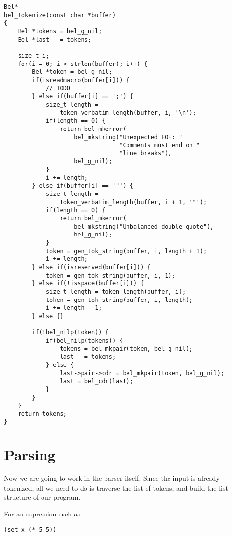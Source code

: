 \documentclass[openright,a4paper,twoside,12pt]{memoir}
\begin{document}
\begin{verbatim}
Bel*
bel_tokenize(const char *buffer)
{
    Bel *tokens = bel_g_nil;
    Bel *last   = tokens;
    
    size_t i;
    for(i = 0; i < strlen(buffer); i++) {
        Bel *token = bel_g_nil;
        if(isreadmacro(buffer[i])) {
            // TODO
        } else if(buffer[i] == ';') {
            size_t length =
                token_verbatim_length(buffer, i, '\n');
            if(length == 0) {
                return bel_mkerror(
                    bel_mkstring("Unexpected EOF: "
                                 "Comments must end on "
                                 "line breaks"),
                    bel_g_nil);
            }
            i += length;
        } else if(buffer[i] == '"') {
            size_t length =
                token_verbatim_length(buffer, i + 1, '"');
            if(length == 0) {
                return bel_mkerror(
                    bel_mkstring("Unbalanced double quote"),
                    bel_g_nil);
            }
            token = gen_tok_string(buffer, i, length + 1);
            i += length;
        } else if(isreserved(buffer[i])) {
            token = gen_tok_string(buffer, i, 1);
        } else if(!isspace(buffer[i])) {
            size_t length = token_length(buffer, i);
            token = gen_tok_string(buffer, i, length);
            i += length - 1;
        } else {}

        if(!bel_nilp(token)) {
            if(bel_nilp(tokens)) {
                tokens = bel_mkpair(token, bel_g_nil);
                last   = tokens;
            } else {
                last->pair->cdr = bel_mkpair(token, bel_g_nil);
                last = bel_cdr(last);
            }
        }
    }
    return tokens;
}
\end{verbatim}

\section{Parsing}
\label{sec:orgbb79b75}

Now we  are going  to work in  the parser itself.  Since the  input is
already tokenized, all  we need to do is traverse  the list of tokens,
and build the list structure of our program.

For an expression such as

\begin{verbatim}
(set x (* 5 5))
\end{verbatim}
\end{document}
